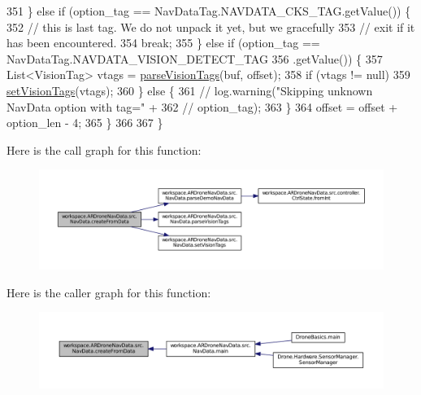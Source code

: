\begin{DoxyCode}
351             \} \textcolor{keywordflow}{else} \textcolor{keywordflow}{if} (option\_tag == NavDataTag.NAVDATA\_CKS\_TAG.getValue()) \{
352                 \textcolor{comment}{// this is last tag. We do not unpack it yet, but we gracefully}
353                 \textcolor{comment}{// exit if it has been encountered.}
354                 \textcolor{keywordflow}{break};
355             \} \textcolor{keywordflow}{else} \textcolor{keywordflow}{if} (option\_tag == NavDataTag.NAVDATA\_VISION\_DETECT\_TAG
356                     .getValue()) \{
357                 List<VisionTag> vtags = \hyperlink{classworkspace_1_1_a_r_drone_nav_data_1_1src_1_1_nav_data_a7644e4b560209b4b0c2cb96084970acd}{parseVisionTags}(buf, offset);
358                 \textcolor{keywordflow}{if} (vtags != null)
359                     \hyperlink{classworkspace_1_1_a_r_drone_nav_data_1_1src_1_1_nav_data_a636d7e555be5221385f60d6d9635363e}{setVisionTags}(vtags);
360             \} \textcolor{keywordflow}{else} \{
361                 \textcolor{comment}{// log.warning("Skipping unknown NavData option with tag=" +}
362                 \textcolor{comment}{// option\_tag);}
363             \}
364             offset = offset + option\_len - 4;
365         \}
366 
367     \}
\end{DoxyCode}


Here is the call graph for this function\+:
\nopagebreak
\begin{figure}[H]
\begin{center}
\leavevmode
\includegraphics[width=350pt]{classworkspace_1_1_a_r_drone_nav_data_1_1src_1_1_nav_data_a48f7de7994b48a30f09910e9971d300d_cgraph}
\end{center}
\end{figure}




Here is the caller graph for this function\+:\nopagebreak
\begin{figure}[H]
\begin{center}
\leavevmode
\includegraphics[width=350pt]{classworkspace_1_1_a_r_drone_nav_data_1_1src_1_1_nav_data_a48f7de7994b48a30f09910e9971d300d_icgraph}
\end{center}
\end{figure}


